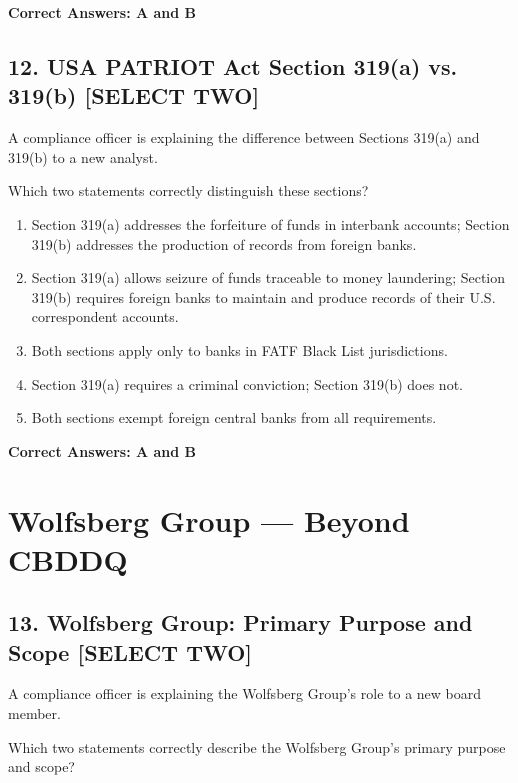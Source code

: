 \documentclass[11pt,a4paper]{article}
\begin{document}
	\textbf{Correct Answers: A and B}
	
	\subsection{12. USA PATRIOT Act Section 319(a) vs. 319(b) \textnormal{[SELECT TWO]}}
	
	A compliance officer is explaining the difference between Sections 319(a) and 319(b) to a new analyst.
	
	Which two statements correctly distinguish these sections?
	
	\begin{enumerate}[label=\Alph*.]
		\item Section 319(a) addresses the forfeiture of funds in interbank accounts; Section 319(b) addresses the production of records from foreign banks.
		\item Section 319(a) allows seizure of funds traceable to money laundering; Section 319(b) requires foreign banks to maintain and produce records of their U.S. correspondent accounts.
		\item Both sections apply only to banks in FATF Black List jurisdictions.
		\item Section 319(a) requires a criminal conviction; Section 319(b) does not.
		\item Both sections exempt foreign central banks from all requirements.
	\end{enumerate}
	
	\textbf{Correct Answers: A and B}
	
	\section{Wolfsberg Group — Beyond CBDDQ}
	
	\subsection{13. Wolfsberg Group: Primary Purpose and Scope \textnormal{[SELECT TWO]}}
	
	A compliance officer is explaining the Wolfsberg Group's role to a new board member.
	
	Which two statements correctly describe the Wolfsberg Group's primary purpose and scope?
	
\end{document}
